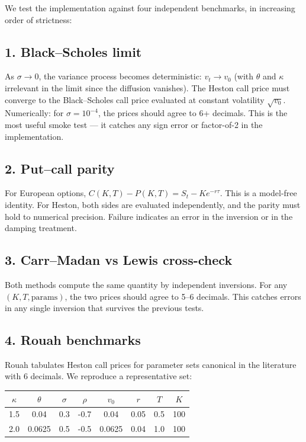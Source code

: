 \documentclass[11pt]{article}
\theoremstyle{plain}
\theoremstyle{definition}
\theoremstyle{remark}
\begin{document}
We test the implementation against four independent benchmarks, in increasing order of strictness:

\subsection*{1. Black--Scholes limit}
As \(\sigma \to 0\), the variance process becomes deterministic: \(v_t \to v_0\) (with \(\theta\) and \(\kappa\) irrelevant in the limit since the diffusion vanishes). The Heston call price must converge to the Black--Scholes call price evaluated at constant volatility \(\sqrt{v_0}\). Numerically: for \(\sigma = 10^{-4}\), the prices should agree to 6+ decimals. This is the most useful smoke test --- it catches any sign error or factor-of-2 in the implementation.

\subsection*{2. Put--call parity}
For European options, \(C(K, T) - P(K, T) = S_t - K e^{-r\tau}\). This is a model-free identity. For Heston, both sides are evaluated independently, and the parity must hold to numerical precision. Failure indicates an error in the inversion or in the damping treatment.

\subsection*{3. Carr--Madan vs Lewis cross-check}
Both methods compute the same quantity by independent inversions. For any \((K, T, \text{params})\), the two prices should agree to 5--6 decimals. This catches errors in any single inversion that survives the previous tests.

\subsection*{4. Rouah benchmarks}
Rouah \cite{Rouah2013} tabulates Heston call prices for parameter sets canonical in the literature with 6 decimals. We reproduce a representative set:

\begin{center}
\begin{tabular}{cccccccc}
\toprule
\(\kappa\) & \(\theta\) & \(\sigma\) & \(\rho\) & \(v_0\) & \(r\) & \(T\) & \(K\) \\
\midrule
1.5 & 0.04 & 0.3 & -0.7 & 0.04 & 0.05 & 0.5 & 100 \\
2.0 & 0.0625 & 0.5 & -0.5 & 0.0625 & 0.04 & 1.0 & 100 \\
\bottomrule
\end{tabular}
\end{center}
\end{document}

